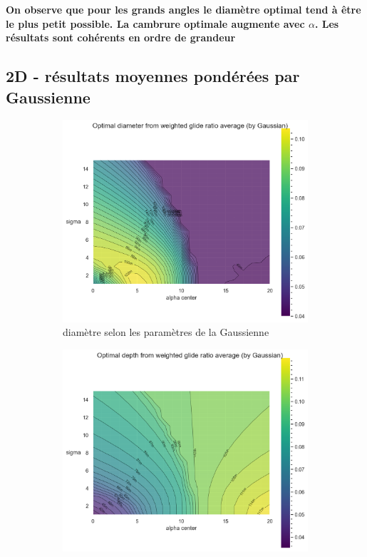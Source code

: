 \textbf{On observe que pour les grands angles le diamètre optimal tend à être le plus petit possible. La cambrure optimale augmente avec $\alpha$. Les résultats sont cohérents en ordre de grandeur}

\subsection{2D - résultats moyennes pondérées par Gaussienne}
\label{sec:Ch3.2}


\begin{figure}[h!]
    \centering
    \begin{subfigure}[b]{0.45\textwidth}
        \centering
        \includegraphics[width=\linewidth]{Pics/diametre gaussian 2d.png}
        \caption{diamètre selon les paramètres de la Gaussienne}
        \label{fig:diametre gaussien 2d}
    \end{subfigure}
    \hfill 
    \begin{subfigure}[b]{0.45\textwidth}
        \centering
        \includegraphics[width=\linewidth]{Pics/depth gaussian 2d.png}

\end{subfigure}
\end{figure}
